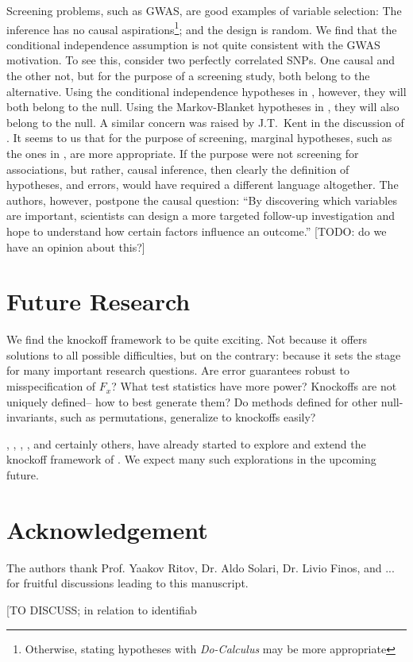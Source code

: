 \documentclass[article,lineno]{biometrika}
\begin{document}
Screening problems, such as GWAS, are good examples of variable selection:
The inference has no causal aspirations\footnote{Otherwise, stating hypotheses with \emph{Do-Calculus} \citep{pearl1995causal} may be more appropriate};
and the design is random.
We find that the conditional independence assumption is not quite consistent with the GWAS motivation.
To see this, consider two perfectly correlated SNPs.
One causal and the other not, but for the purpose of a screening study, both belong to the alternative.
Using the conditional independence hypotheses in \cite{SesiaGenehuntinghidden}, however, they will both belong to the null.
Using the Markov-Blanket hypotheses in \cite{CandesPanninggoldmodelX2018}, they will also belong to the null.
A similar concern was raised by J.T.\ Kent in the discussion of \cite{MeinshausenStabilityselection2010}.
It seems to us that for the purpose of screening, marginal hypotheses, such as the ones in \cite{TusherSignificanceanalysismicroarrays2001}, are more appropriate.
If the purpose were not screening for associations, but rather, causal inference, then clearly the definition of hypotheses, and errors, would have required a different language altogether.
The authors, however, postpone the causal question: ``By discovering which variables are important, scientists can design a more targeted follow-up investigation and hope to understand how certain factors influence an outcome.''
[TODO: do we have an opinion about this?]






\section{Future Research}

We find the knockoff framework to be quite exciting.
Not because it offers solutions to all possible difficulties, but on the contrary: because it sets the stage for many important research questions.
Are error guarantees robust to misspecification of $F_x$?
What test statistics have more power?
Knockoffs are not uniquely defined-- how to best generate them?
Do methods defined for other null-invariants, such as permutations, generalize to knockoffs easily?

\cite{DaiknockofffilterFDR2016}, \cite{JansonFamilywiseerrorrate2016}, \cite{ChenAnalysisKnockoffFilter2017}, \cite{ChenPseudoKnockoffFilter2017}, and certainly others, have already started to explore and extend the knockoff framework of \cite{BarberControllingfalsediscovery2015}.
We expect many such explorations in the upcoming future.



\section*{Acknowledgement}
The authors thank Prof. Yaakov Ritov, Dr. Aldo Solari, Dr. Livio Finos, and ... for fruitful discussions leading to this manuscript.


[TO DISCUSS; in relation to identifiab



\end{document}
